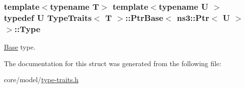 \subsubsection[{\texorpdfstring{Type}{Type}}]{\setlength{\rightskip}{0pt plus 5cm}template$<$typename T$>$ template$<$typename U $>$ typedef U {\bf Type\+Traits}$<$ T $>$\+::{\bf Ptr\+Base}$<$ {\bf ns3\+::\+Ptr}$<$ U $>$ $>$\+::{\bf Type}}\hypertarget{structTypeTraits_1_1PtrBase_3_01ns3_1_1Ptr_3_01U_01_4_01_4_a5045cf7c9ab426581362605942a92ed5}{}\label{structTypeTraits_1_1PtrBase_3_01ns3_1_1Ptr_3_01U_01_4_01_4_a5045cf7c9ab426581362605942a92ed5}
\hyperlink{structTypeTraits_1_1Base}{Base} type. 

The documentation for this struct was generated from the following file\+:\begin{DoxyCompactItemize}
\item 
core/model/\hyperlink{type-traits_8h}{type-\/traits.\+h}\end{DoxyCompactItemize}
